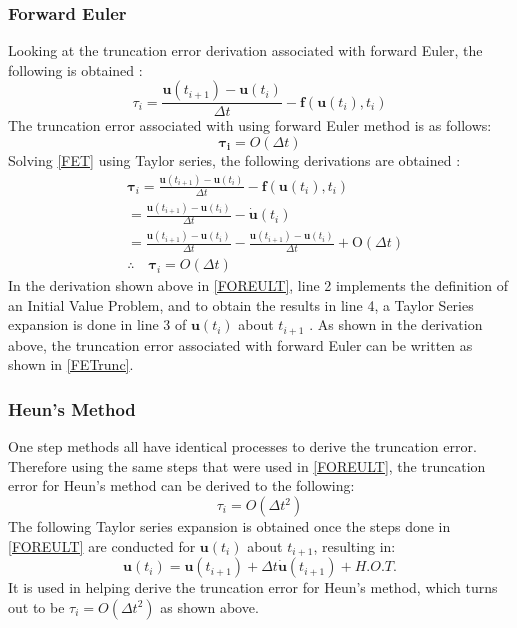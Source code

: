 \documentclass[conf]{new-aiaa}
\begin{document}
        \subsubsection{Forward Euler}
        Looking at the truncation error derivation associated with forward Euler, the following is obtained \cite{LecER}:
        \begin{equation}
            \tau_i = \frac{\bm{u}(t_{i+1}) - \bm{u}(t_i)}{\Delta t} - \bm{f}(\bm{u}(t_i),t_i) \label{FET}
        \end{equation}
        The truncation error associated with using forward Euler method is as follows:
        \begin{equation}
            \bm{\tau_i} = O(\Delta t) \label{FETrunc}
        \end{equation}
        Solving \eqref{FET} using Taylor series, the following derivations are obtained \cite{LecER}:
        \begin{equation}
        \begin{aligned}
        &\bm{\tau}_{i}=\frac{\bm{u}\left(t_{i+1}\right)-\bm{u}\left(t_{i}\right)}{\Delta t}-\bm{f}\left(\bm{u}\left(t_{i}\right), t_{i}\right)\\
        & =\frac{\bm{u}\left(t_{i+1}\right)-\bm{u}\left(t_{i}\right)}{\Delta t}-\dot{\bm{u}}\left(t_{i}\right) \\
        &=\frac{\bm{u}\left(t_{i+1}\right)-\bm{u}\left(t_{i}\right)}{\Delta t}-\frac{\bm{u}\left(t_{i+1}\right)-\bm{u}\left(t_{i}\right)}{\Delta t}+\mathrm{O}(\Delta t)\\
        &\therefore \quad \bm{\tau}_{i}=O(\Delta t) \label{FOREULT}
        \end{aligned}
        \end{equation}
        In the derivation shown above in \eqref{FOREULT}, line 2 implements the definition of an Initial Value Problem, and to obtain the results in line 4, a Taylor Series expansion is done in line 3 of $\bm{u}(t_i)$ about $t_{i+1}$ \cite{LecER}. As shown in the derivation above, the truncation error associated with forward Euler can be written as shown in \eqref{FETrunc}.
        
        \subsubsection{Heun's Method}
        One step methods all have identical processes to derive the truncation error\cite{LecER}. Therefore using the same steps that were used in \eqref{FOREULT}, the truncation error for Heun's method can be derived to the following:
        \begin{equation}
            \tau_i = O(\Delta t^2)
        \end{equation}
        The following Taylor series expansion is obtained once the steps done in \eqref{FOREULT} are conducted for $\bm{u}(t_i)$ about $t_{i+1}$, resulting in:
        \begin{equation}
        \bm{u}(t_i) = \bm{u}(t_{i+1}) + \Delta t\bm{\dot{u}}(t_{i+1})+ H.O.T. \label{TruncH}
        \end{equation}
        It is used in helping derive the truncation error for Heun's method, which turns out to be $\tau_i = O(\Delta t^2)$ as shown above.
        
\end{document}
